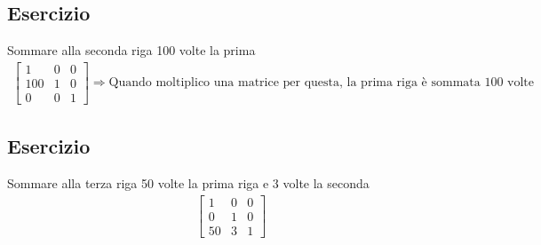 \documentclass[italian]{article}
\begin{document}
\subsection{Esercizio} Sommare alla seconda riga 100 volte la prima
\begin{gather*}
	\begin{bmatrix}
		1 & 0 & 0 \\
		100 & 1 & 0 \\
		0 & 0 & 1 
	\end{bmatrix}
	\Rightarrow 
	\text{Quando moltiplico una matrice per questa, la prima riga è sommata 100 volte alla seconda}
\end{gather*}
\subsection{Esercizio} Sommare alla terza riga 50 volte la prima riga e 3 volte la seconda
\begin{gather*}
	\begin{bmatrix}
		1 & 0 & 0 \\
		0 & 1 & 0 \\
		50 & 3 & 1 
	\end{bmatrix}
\end{gather*}
\end{document}
